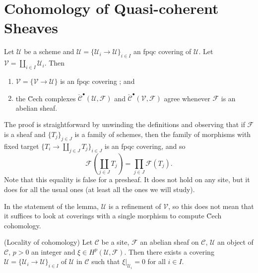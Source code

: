 \section{Cohomology of Quasi-coherent Sheaves}
\label{section-cohomology-quasi-coherent}

\begin{lemma}
\label{lemma-cech-complex}
Let $\mathcal{U}$ be a scheme and $\mathcal{U} = \{ \mathcal{U}_i \to
\mathcal{U} \}_{i \in I}$ an fpqc covering of $\mathcal{U}$. Let $\mathcal{V}
= \coprod_{i \in I} \mathcal{U}_i$. Then
\begin{enumerate}
\item
$\mathcal{V} = \{ \mathcal{V} \to \mathcal{U} \}$ is an fpqc covering ; and
\item
the \u Cech complexes $\check{\mathcal{C}}^\bullet (\mathcal{U}, \mathcal{F})$
and $\check{\mathcal{C}}^\bullet (\mathcal{V}, \mathcal{F})$ agree whenever
$\mathcal{F}$ is an abelian sheaf.
\end{enumerate}
\end{lemma}

\noindent
The proof is straightforward by unwinding the definitions and observing that if
$\mathcal{F}$ is a sheaf and $\{ T_j \}_{j \in J}$ is a family of schemes, then
the family of morphisms with fixed target $\{ T_i \to \coprod_{j \in J} T_j
\}_{i \in J}$ is an fpqc covering, and so
$$
\mathcal{F} \left( \coprod_{j \in J} T_j \right) = \prod_{j \in J}
\mathcal{F} (T_j).
$$
Note that this equality is false for a presheaf. It does not hold on any site,
but it does for all the usual ones (at least all the ones we will study).

\begin{remark}
\label{remark-refinement}
In the statement of the lemma, $\mathcal{U}$ is a refinement of $\mathcal{V}$,
so this does not mean that it suffices to look at coverings with a single
morphism to compute \u Cech cohomology.
\end{remark}

\begin{lemma}
\label{lemma-locality-cohomology}
(Locality of cohomology)
Let $\mathcal{C}$ be a site, $\mathcal{F}$ an abelian sheaf on $\mathcal{C}$,
$\mathcal{U}$ an object of $\mathcal{C}$, $p >0$ an integer and $\xi \in
H^p(\mathcal{U}, \mathcal{F})$. Then there exists a covering $\mathcal{U} = \{
\mathcal{U}_i \to \mathcal{U} \}_{i \in I}$ of $\mathcal{U}$ in $\mathcal{C}$
such that $\xi |_{\mathcal{U}_i} = 0$ for all $i \in I$.
\end{lemma}

